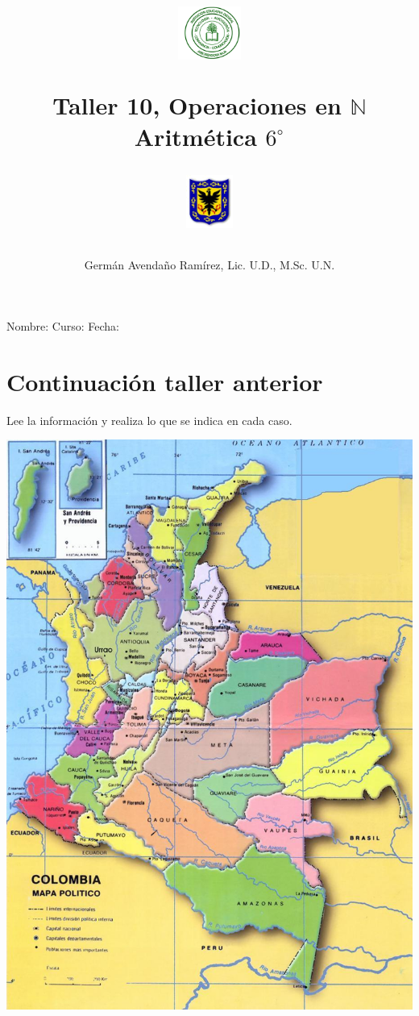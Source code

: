 \documentclass[10pt,twoside]{article}
\author{Germ\'an Avenda\~no Ram\'irez, Lic. U.D., M.Sc. U.N.}
\title{\begin{minipage}{.2\textwidth}
\includegraphics[height=1.75cm]{Images/logo-colegio.png}
\end{minipage}
\begin{minipage}{.55\textwidth}
\begin{center}
Taller 10, Operaciones en $\mathbb{N}$ \\
Aritm\'{e}tica $6^{\circ}$
\end{center}
\end{minipage}\hfill
\begin{minipage}{.2\textwidth}
\includegraphics[height=1.75cm]{Images/logo-sed.png} 
\end{minipage}}
\date{}
\begin{document}
\maketitle
Nombre: \hrulefill Curso: \underline{\hspace*{44pt}} Fecha: \underline{\hspace*{2.5cm}}
\section*{Continuaci\'{o}n taller anterior}
Lee la información y realiza lo que se indica en cada caso.\\

\begin{minipage}{.45\textwidth}
\begin{center}
\includegraphics[scale=.7]{Images/mapa_colombia.jpg} 
\end{center}
\end{minipage}\hfill
\end{document}
